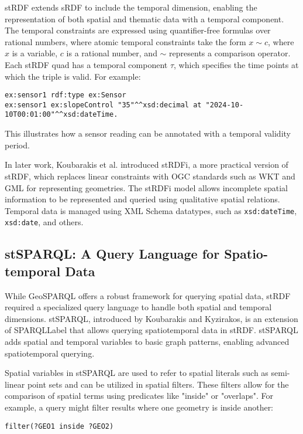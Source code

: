 stRDF extends sRDF to include the temporal dimension, enabling the representation of both spatial and thematic data with a temporal component. The temporal constraints are expressed using quantifier-free formulas over rational numbers, where atomic temporal constraints take the form \( x \sim c \), where \( x \) is a variable, \( c \) is a rational number, and \( \sim \) represents a comparison operator. Each stRDF quad has a temporal component \( \tau \), which specifies the time points at which the triple is valid. For example:
\begin{lstlisting}[caption=the Tower of Pisa sensor controle the slope, label={lst:tower-Pisa-slope}]
ex:sensor1 rdf:type ex:Sensor
ex:sensor1 ex:slopeControl "35"^^xsd:decimal at "2024-10-10T00:01:00"^^xsd:dateTime.
\end{lstlisting}
This illustrates how a sensor reading can be annotated with a temporal validity period.

In later work, Koubarakis et al. \cite{koubarakisChallengesQualitativeSpatial2011} introduced stRDFi, a more practical version of stRDF, which replaces linear constraints with OGC standards such as WKT and GML for representing geometries. The stRDFi model allows incomplete spatial information to be represented and queried using qualitative spatial relations. Temporal data is managed using XML Schema datatypes, such as \texttt{xsd:dateTime}, \texttt{xsd:date}, and others. 

\subsection{stSPARQL: A Query Language for Spatio-temporal Data}\label{III-subsec:stsparql}

While GeoSPARQL offers a robust framework for querying spatial data, stRDF required a specialized query language to handle both spatial and temporal dimensions. stSPARQL, introduced by Koubarakis and Kyzirakos, is an extension of \acrshort{SPARQLLabel} that allows querying spatiotemporal data in stRDF. stSPARQL adds spatial and temporal variables to basic graph patterns, enabling advanced spatiotemporal querying. 

Spatial variables in stSPARQL are used to refer to spatial literals such as semi-linear point sets and can be utilized in spatial filters. These filters allow for the comparison of spatial terms using predicates like "inside" or "overlaps". For example, a query might filter results where one geometry is inside another:
\begin{lstlisting}[caption=Filter command with inside predicate, label={lstfilter-inside}]
    filter(?GEO1 inside ?GEO2)
\end{lstlisting}



